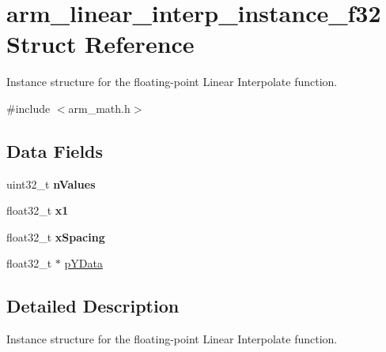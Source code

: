 \hypertarget{structarm__linear__interp__instance__f32}{\section{arm\-\_\-linear\-\_\-interp\-\_\-instance\-\_\-f32 Struct Reference}
\label{structarm__linear__interp__instance__f32}
}


Instance structure for the floating-\/point Linear Interpolate function.  




{\ttfamily \#include $<$arm\-\_\-math.\-h$>$}

\subsection*{Data Fields}
\begin{DoxyCompactItemize}
\item 
\hypertarget{structarm__linear__interp__instance__f32_a2ea653b0599388e9a72ebab9841707ba}{uint32\-\_\-t {\bfseries n\-Values}}\label{structarm__linear__interp__instance__f32_a2ea653b0599388e9a72ebab9841707ba}

\item 
\hypertarget{structarm__linear__interp__instance__f32_a795ed79ea4c18d52afe5eb5e868e1c5a}{float32\-\_\-t {\bfseries x1}}\label{structarm__linear__interp__instance__f32_a795ed79ea4c18d52afe5eb5e868e1c5a}

\item 
\hypertarget{structarm__linear__interp__instance__f32_a08675584bb57fc42bbb3739c13674346}{float32\-\_\-t {\bfseries x\-Spacing}}\label{structarm__linear__interp__instance__f32_a08675584bb57fc42bbb3739c13674346}

\item 
float32\-\_\-t $\ast$ \hyperlink{structarm__linear__interp__instance__f32_af1489866b69eb5db1e0afeb24c7b01e9}{p\-Y\-Data}
\end{DoxyCompactItemize}


\subsection{Detailed Description}
Instance structure for the floating-\/point Linear Interpolate function. 

